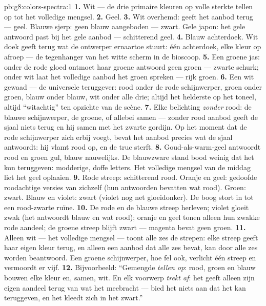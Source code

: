 \begin{solution}{pb:g8:colors-spectra:1}
\textbf{1.} Wit --- de drie primaire kleuren op volle sterkte tellen op
tot het volledige mengsel.
\textbf{2.} Geel.
\textbf{3.} Wit overhemd: geeft het aanbod terug --- geel. Blauwe
sjerp: geen blauw aangeboden --- zwart. Gele japon: het gele antwoord
past bij het gele aanbod --- schitterend geel.
\textbf{4.} Blauw achterdoek. Wit doek geeft terug wat de ontwerper
ernaartoe stuurt: één achterdoek, elke kleur op afroep --- de tegenhanger
van het witte scherm in de bioscoop.
\textbf{5.} Een groene jas: onder de rode gloed ontmoet haar groene
antwoord geen groen --- zwarte schurk; onder wit  laat het
volledige aanbod het groen spreken --- rijk groen.
\textbf{6.} Een wit gewaad --- de universele teruggever: rood onder de
rode schijnwerper, groen onder groen, blauw onder blauw, wit onder alle
drie; altijd het helderste op het toneel, altijd ``witachtig'' ten
opzichte van de scène.
\textbf{7.} Elke belichting \emph{zonder} rood: de blauwe
schijnwerper, de groene, of allebei samen --- zonder rood aanbod geeft
de sjaal niets terug en  hij samen met het zwarte gordijn.
Op het moment dat de rode schijnwerper zich erbij voegt, bevat het
aanbod precies wat de sjaal antwoordt: hij vlamt rood op, en de truc
sterft.
\textbf{8.} Goud-als-warm-geel antwoordt rood en groen gul, blauw
nauwelijks. De blauwzware stand bood weinig dat het kon teruggeven:
modderige, doffe letters. Het volledige mengsel van de middag liet het
geel oplaaien.
\textbf{9.} Rode streep: schitterend rood. Oranje en geel: gedoofde
roodachtige versies van zichzelf (hun antwoorden bevatten wat rood).
Groen: zwart. Blauw en violet: zwart (violet nog net gloeidonker). De
boog stort in tot een rood-zwarte ruïne.
\textbf{10.} De rode en de blauwe streep herleven; violet gloeit zwak
(het antwoordt blauw en wat rood); oranje en geel tonen alleen hun
zwakke rode aandeel; de groene streep blijft zwart --- magenta
 bevat geen groen.
\textbf{11.} Alleen wit  --- het volledige mengsel --- toont
alle zes de strepen: elke streep geeft haar eigen kleur terug, en
alleen een aanbod dat alle zes bevat, kan door alle zes worden
beantwoord. Een groene schijnwerper, hoe fel ook, verlicht één
streep en vermoordt er vijf.
\textbf{12.} Bijvoorbeeld: ``Gemengde  \emph{tellen op}:
rood, groen en blauw bouwen elke kleur en, samen, wit. En elk voorwerp
\emph{trekt af}: het geeft alleen zijn eigen aandeel terug van wat het
 meebracht --- bied het niets aan dat het kan teruggeven, en
het kleedt zich in het zwart.''
\end{solution}
